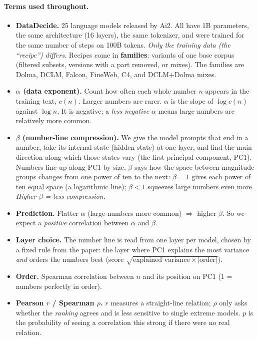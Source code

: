 \documentclass[11pt]{article}
\begin{document}
\paragraph{Terms used throughout.}
\begin{itemize}
\item \textbf{DataDecide.} 25 language models released by Ai2. All have 1B parameters, the same
  architecture (16 layers), the same tokenizer, and were trained for the same number of steps on
  100B tokens. \emph{Only the training data (the ``recipe'') differs.} Recipes come in
  \textbf{families}: variants of one base corpus (filtered subsets, versions with a part removed,
  or mixes). The families are Dolma, DCLM, Falcon, FineWeb, C4, and DCLM+Dolma mixes.
\item \textbf{$\alpha$ (data exponent).} Count how often each whole number $n$ appears in the
  training text, $c(n)$. Larger numbers are rarer. $\alpha$ is the slope of $\log c(n)$ against
  $\log n$. It is negative; a \emph{less negative} $\alpha$ means large numbers are relatively more
  common.
\item \textbf{$\beta$ (number-line compression).} We give the model prompts that end in a number,
  take its internal state (hidden state) at one layer, and find the main direction along which
  those states vary (the first principal component, PC1). Numbers line up along PC1 by size. $\beta$
  says how the space between magnitude groups changes from one power of ten to the next:
  $\beta = 1$ gives each power of ten equal space (a logarithmic line); $\beta < 1$ squeezes large
  numbers even more. \emph{Higher $\beta$ = less compression.}
\item \textbf{Prediction.} Flatter $\alpha$ (large numbers more common) $\Rightarrow$ higher $\beta$.
  So we expect a \emph{positive} correlation between $\alpha$ and $\beta$.
\item \textbf{Layer choice.} The number line is read from one layer per model, chosen by a fixed rule
  from the paper: the layer where PC1 explains the most variance \emph{and} orders the numbers best
  (score $\sqrt{\text{explained variance}\times|\text{order}|}$).
\item \textbf{Order.} Spearman correlation between $n$ and its position on PC1 (1 = numbers perfectly
  in order).
\item \textbf{Pearson $r$ / Spearman $\rho$.} $r$ measures a straight-line relation; $\rho$ only
  asks whether the \emph{ranking} agrees and is less sensitive to single extreme models. $p$ is the
  probability of seeing a correlation this strong if there were no real relation.
\end{itemize}
\end{document}

